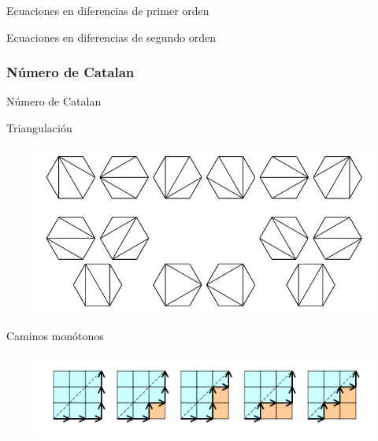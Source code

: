 \begin{frame}
\begin{block}{Ecuaciones en diferencias de primer orden}
\end{block}

\begin{block}{Ecuaciones en diferencias de segundo orden}
\end{block}
\end{frame}

\subsubsection{Número de Catalan}

\begin{frame}{Número de Catalan}
\begin{block}{Triangulación}
	\begin{figure}
	\centering
	\includegraphics[scale=0.15]{ca1}
	\end{figure}
\end{block}

\begin{block}{Caminos monótonos}
	\begin{figure}
	\centering
	\includegraphics[scale=0.25]{ca2}
	\end{figure}
\end{block}
\end{frame}